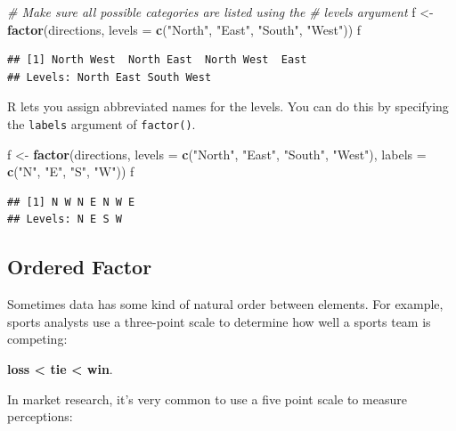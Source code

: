 \documentclass[
]{book}
\newenvironment{Shaded}{\begin{snugshade}}{\end{snugshade}}
\newcommand{\CommentTok}[1]{\textcolor[rgb]{0.56,0.35,0.01}{\textit{#1}}}
\newcommand{\DataTypeTok}[1]{\textcolor[rgb]{0.13,0.29,0.53}{#1}}
\newcommand{\KeywordTok}[1]{\textcolor[rgb]{0.13,0.29,0.53}{\textbf{#1}}}
\newcommand{\NormalTok}[1]{#1}
\newcommand{\StringTok}[1]{\textcolor[rgb]{0.31,0.60,0.02}{#1}}
\begin{document}
\begin{Shaded}
\begin{Highlighting}[]
\CommentTok{# Make sure all possible categories are listed using the}
\CommentTok{# levels argument}
\NormalTok{f <-}\StringTok{ }\KeywordTok{factor}\NormalTok{(directions, }\DataTypeTok{levels =} \KeywordTok{c}\NormalTok{(}\StringTok{"North"}\NormalTok{, }\StringTok{"East"}\NormalTok{, }\StringTok{"South"}\NormalTok{,}
    \StringTok{"West"}\NormalTok{))}
\NormalTok{f}
\end{Highlighting}
\end{Shaded}

\begin{verbatim}
## [1] North West  North East  North West  East 
## Levels: North East South West
\end{verbatim}

R lets you assign abbreviated names for the levels. You can do this by specifying the \texttt{labels} argument of \texttt{factor()}.

\begin{Shaded}
\begin{Highlighting}[]
\NormalTok{f <-}\StringTok{ }\KeywordTok{factor}\NormalTok{(directions, }\DataTypeTok{levels =} \KeywordTok{c}\NormalTok{(}\StringTok{"North"}\NormalTok{, }\StringTok{"East"}\NormalTok{, }\StringTok{"South"}\NormalTok{,}
    \StringTok{"West"}\NormalTok{), }\DataTypeTok{labels =} \KeywordTok{c}\NormalTok{(}\StringTok{"N"}\NormalTok{, }\StringTok{"E"}\NormalTok{, }\StringTok{"S"}\NormalTok{, }\StringTok{"W"}\NormalTok{))}
\NormalTok{f}
\end{Highlighting}
\end{Shaded}

\begin{verbatim}
## [1] N W N E N W E
## Levels: N E S W
\end{verbatim}

\hypertarget{ordered-factor}{%
\subsection{Ordered Factor}\label{ordered-factor}}

Sometimes data has some kind of natural order between elements. For example, sports analysts use a three-point scale to determine how well a sports team is competing:

\textbf{loss \textless{} tie \textless{} win}.

In market research, it's very common to use a five point scale to measure perceptions:
\end{document}
